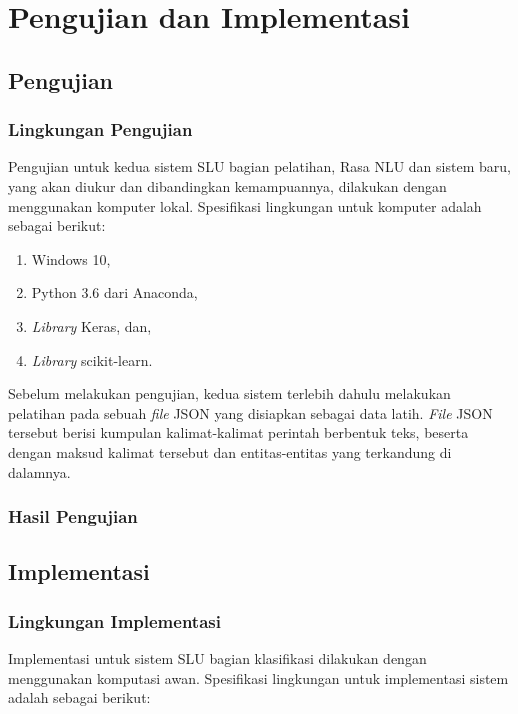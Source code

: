 \chapter{Pengujian dan Implementasi}

\section{Pengujian}

\subsection{Lingkungan Pengujian}

Pengujian untuk kedua sistem SLU bagian pelatihan, Rasa NLU dan sistem baru, yang akan diukur dan dibandingkan kemampuannya, dilakukan dengan menggunakan komputer lokal. Spesifikasi lingkungan untuk komputer adalah sebagai berikut:

\begin{enumerate}
    \item Windows 10,
    \item Python 3.6 dari Anaconda,
    \item \textit{Library} Keras, dan,
    \item \textit{Library} scikit-learn.
\end{enumerate}

Sebelum melakukan pengujian, kedua sistem terlebih dahulu melakukan pelatihan pada sebuah \textit{file} JSON yang disiapkan sebagai data latih. \textit{File} JSON tersebut berisi kumpulan kalimat-kalimat perintah berbentuk teks, beserta dengan maksud kalimat tersebut dan entitas-entitas yang terkandung di dalamnya.

\subsection{Hasil Pengujian}
\blindtext

\section{Implementasi}

\subsection{Lingkungan Implementasi}

Implementasi untuk sistem SLU bagian klasifikasi dilakukan dengan menggunakan komputasi awan. Spesifikasi lingkungan untuk implementasi sistem adalah sebagai berikut:


